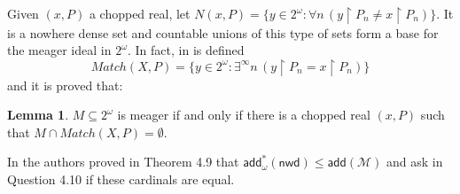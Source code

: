 \documentclass{amsart}
\theoremstyle{definition}
\newtheorem{theorem}{Theorem}[section]
\newtheorem{lemma}[theorem]{Lemma}
\theoremstyle{remark}
\numberwithin{equation}{section}
\newcommand{\nwd}{\mathsf{nwd}}
\newcommand{\add}{\mathsf{add}}
\begin{document}

Given $(x,P)$ a chopped real, let $N(x,P)=\{y\in2^\omega: \forall n \,(y\upharpoonright P_n\neq x\upharpoonright P_n)\}$. It is a nowhere dense set and countable unions of this type of sets form a base for the meager ideal in $2^{\omega}$. In fact, in \cite{combinatorial} is defined 
\[
Match(X,P)=\{y\in2^\omega: \exists^\infty n \,(y\upharpoonright P_n= x\upharpoonright P_n)\}
\]
and it is proved that:

\begin{lemma}\label{chopped}
    $M\subseteq 2^\omega$ is meager if and only if there is a chopped real $(x,P)$ such that $M\cap Match(X,P)=\emptyset$.
\end{lemma}


In \cite{poke} the authors proved in Theorem 4.9 that $\add^*_\omega(\nwd)\leq \add(\mathcal{M})$ and ask in Question 4.10 if these cardinals are equal.
\end{document}
